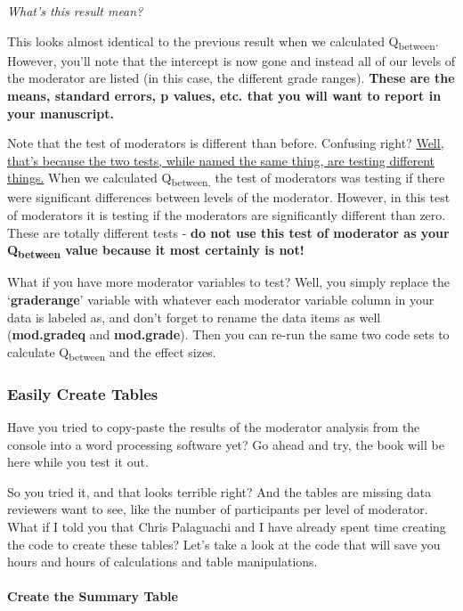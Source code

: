 \documentclass[
]{book}
\begin{document}
\emph{What's this result mean?}

This looks almost identical to the previous result when we calculated Q\textsubscript{between}. However, you'll note that the intercept is now gone and instead all of our levels of the moderator are listed (in this case, the different grade ranges). \textbf{These are the means, standard errors, p values, etc. that you will want to report in your manuscript.}

Note that the test of moderators is different than before. Confusing right? \ul{Well, that's because the two tests, while named the same thing, are testing different things.} When we calculated Q\textsubscript{between,} the test of moderators was testing if there were significant differences between levels of the moderator. However, in this test of moderators it is testing if the moderators are significantly different than zero. These are totally different tests - \textbf{do not use this test of moderator as your Q\textsubscript{between} value because it most certainly is not!}

What if you have more moderator variables to test? Well, you simply replace the `\textbf{graderange}' variable with whatever each moderator variable column in your data is labeled as, and don't forget to rename the data items as well (\textbf{mod.gradeq} and \textbf{mod.grade}). Then you can re-run the same two code sets to calculate Q\textsubscript{between} and the effect sizes.

\hypertarget{easily-create-tables}{%
\subsubsection{Easily Create Tables}\label{easily-create-tables}}

Have you tried to copy-paste the results of the moderator analysis from the console into a word processing software yet? Go ahead and try, the book will be here while you test it out.

So you tried it, and that looks terrible right? And the tables are missing data reviewers want to see, like the number of participants per level of moderator. What if I told you that Chris Palaguachi and I have already spent time creating the code to create these tables? Let's take a look at the code that will save you hours and hours of calculations and table manipulations.

\hypertarget{create-the-summary-table}{%
\paragraph{Create the Summary Table}\label{create-the-summary-table}}
\end{document}
